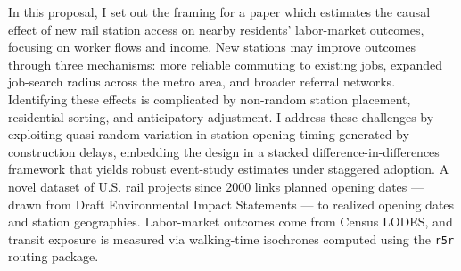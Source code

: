 In this proposal, I set out the framing for a paper which estimates the causal effect of new rail station access on nearby residents' labor-market outcomes, focusing on worker flows and income. New stations may improve outcomes through three mechanisms: more reliable commuting to existing jobs, expanded job-search radius across the metro area, and broader referral networks. Identifying these effects is complicated by non-random station placement, residential sorting, and anticipatory adjustment. I address these challenges by exploiting quasi-random variation in station opening timing generated by construction delays, embedding the design in a stacked difference-in-differences framework that yields robust event-study estimates under staggered adoption. A novel dataset of U.S. rail projects since 2000 links planned opening dates — drawn from Draft Environmental Impact Statements — to realized opening dates and station geographies. Labor-market outcomes come from Census LODES, and transit exposure is measured via walking-time isochrones computed using the \texttt{r5r} routing package.